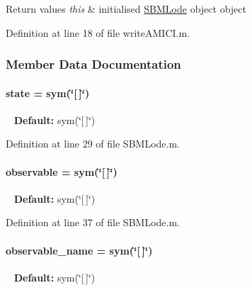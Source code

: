 \begin{DoxyRetVals}{Return values}
{\em this} & initialised \hyperlink{class_s_b_m_lode}{S\+B\+M\+Lode} object object \\
\hline
\end{DoxyRetVals}


Definition at line 18 of file write\+A\+M\+I\+C\+I.\+m.



\subsubsection{Member Data Documentation}
\hypertarget{class_s_b_m_lode_adc6e5733fc3c22f0a7b2914188c49c90}{}
\paragraph[{state}]{\setlength{\rightskip}{0pt plus 5cm}state = sym(\char`\"{}\mbox{[}$\,$\mbox{]}\char`\"{})}\label{class_s_b_m_lode_adc6e5733fc3c22f0a7b2914188c49c90}
~\newline
{\bfseries Default\+:} sym(\char`\"{}\mbox{[}$\,$\mbox{]}\char`\"{}) 

Definition at line 29 of file S\+B\+M\+Lode.\+m.

\hypertarget{class_s_b_m_lode_a072b6f6192ac4f40e74b69f901ecdfef}{}
\paragraph[{observable}]{\setlength{\rightskip}{0pt plus 5cm}observable = sym(\char`\"{}\mbox{[}$\,$\mbox{]}\char`\"{})}\label{class_s_b_m_lode_a072b6f6192ac4f40e74b69f901ecdfef}
~\newline
{\bfseries Default\+:} sym(\char`\"{}\mbox{[}$\,$\mbox{]}\char`\"{}) 

Definition at line 37 of file S\+B\+M\+Lode.\+m.

\hypertarget{class_s_b_m_lode_a6e638e3379dc2d099b3cf3083246fbe0}{}
\paragraph[{observable\+\_\+name}]{\setlength{\rightskip}{0pt plus 5cm}observable\+\_\+name = sym(\char`\"{}\mbox{[}$\,$\mbox{]}\char`\"{})}\label{class_s_b_m_lode_a6e638e3379dc2d099b3cf3083246fbe0}
~\newline
{\bfseries Default\+:} sym(\char`\"{}\mbox{[}$\,$\mbox{]}\char`\"{}) 

